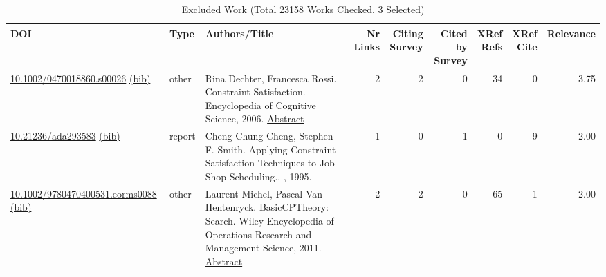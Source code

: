 {\scriptsize
\begin{longtable}{p{5cm}lp{11cm}rrrrrr}
\caption{Excluded Work (Total 23158 Works Checked, 3 Selected)}\\ \toprule
DOI & Type & Authors/Title & \shortstack{Nr\\Links} & \shortstack{Citing\\Survey} & \shortstack{Cited by\\Survey} & \shortstack{XRef\\Refs} & \shortstack{XRef\\Cite} & Relevance\\ \midrule\endhead
\bottomrule
\endfoot
\href{http://dx.doi.org/10.1002/0470018860.s00026}{10.1002/0470018860.s00026} \href{https://www.doi2bib.org/bib/10.1002/0470018860.s00026}{(bib)} & other & Rina Dechter, Francesca Rossi. Constraint Satisfaction. Encyclopedia of Cognitive Science, 2006. \hyperref[mw:mw15899]{Abstract} & 2 & 2 & 0 & 34 & 0 &  3.75\\
\href{http://dx.doi.org/10.21236/ada293583}{10.21236/ada293583} \href{https://www.doi2bib.org/bib/10.21236/ada293583}{(bib)} & report & Cheng-Chung Cheng, Stephen F. Smith. Applying Constraint Satisfaction Techniques to Job Shop Scheduling.. , 1995. & 1 & 0 & 1 & 0 & 9 &  2.00\\
\href{http://dx.doi.org/10.1002/9780470400531.eorms0088}{10.1002/9780470400531.eorms0088} \href{https://www.doi2bib.org/bib/10.1002/9780470400531.eorms0088}{(bib)} & other & Laurent Michel, Pascal Van Hentenryck. BasicCPTheory: Search. Wiley Encyclopedia of Operations Research and Management Science, 2011. \hyperref[mw:mw19699]{Abstract} & 2 & 2 & 0 & 65 & 1 &  2.00\\
\end{longtable}
}

